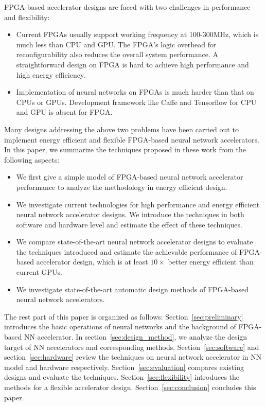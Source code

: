 FPGA-based accelerator designs are faced with two challenges in performance and flexibility:
\begin{itemize}
    \item Current FPGAs usually support working frequency at 100-300MHz, which is much less than CPU and GPU. The FPGA's logic overhead for reconfigurability also reduces the overall system performance. A straightforward design on FPGA is hard to achieve high performance and high energy efficiency.
    \item Implementation of neural networks on FPGAs is much harder than that on CPUs or GPUs. Development framework like Caffe and Tensorflow for CPU and GPU is absent for FPGA.
\end{itemize}
 
Many designs addressing the above two problems have been carried out to implement energy efficient and flexible FPGA-based neural network accelerators. In this paper, we summarize the techniques proposed in these work from the following aspects:
\begin{itemize}
    \item We first give a simple model of FPGA-based neural network accelerator performance to analyze the methodology in energy efficient design.
    \item We investigate current technologies for high performance and energy efficient neural network accelerator designs. We introduce the techniques in both software and hardware level and estimate the effect of these techniques.
    \item We compare state-of-the-art neural network accelerator designs to evaluate the techniques introduced and estimate the achievable performance of FPGA-based accelerator design, which is at least $10\times$ better energy efficient than current GPUs.
    \item We investigate state-of-the-art automatic design methods of FPGA-based neural network accelerators. 
\end{itemize}

The rest part of this paper is organized as follows: Section~\ref{sec:preliminary} introduces the basic operations of neural networks and the background of FPGA-based NN accelerator. In section~\ref{sec:design_method}, we analyze the design target of NN accelerators and corresponding methods. Section~\ref{sec:software} and section~\ref{sec:hardware} review the techniques on neural network accelerator in NN model and hardware respectively. Section~\ref{sec:evaluation} compares existing designs and evaluate the techniques. Section~\ref{sec:flexibility} introduces the methods for a flexible accelerator design. Section~\ref{sec:conclusion} concludes this paper.